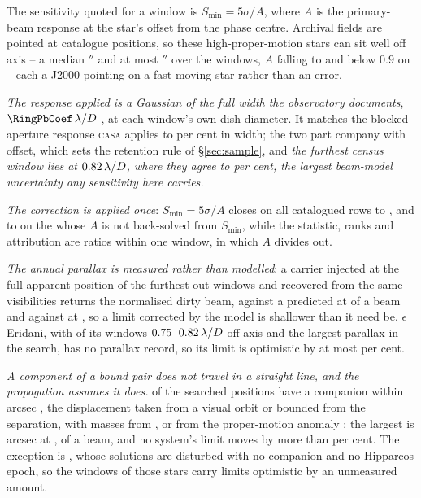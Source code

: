 The sensitivity quoted for a window is $S_{\min}=5\sigma/A$, where $A$ is the
primary-beam response at the star's offset from the phase centre. Archival
fields are pointed at catalogue positions, so these high-proper-motion stars
can sit well off axis -- a median \PbOffMed$''$ and at most \BmOffMax$''$
over the \PbNWin{} windows, $A$ falling to \BmRespMin{} and below $0.9$ on
\BmNBelowNine{} -- each a J2000 pointing on a fast-moving star rather than an
error.

\emph{The response applied is a Gaussian of the full width the observatory
documents}, $\RingPbCoef\,\lambda/D$ \citep{ALMAHandbook}, at each window's
own dish diameter. It matches the blocked-aperture response \textsc{casa}
applies \citep{CASA2022} to \BmDocAiryPct{} per cent in width; the two part
company with offset, which sets the retention rule of \S\ref{sec:sample}, and
\emph{the furthest census window lies at $0.82\,\lambda/D$, where
they agree to \BmCensusWorstPct{} per cent, the largest beam-model uncertainty
any sensitivity here carries.}



\emph{The correction is applied once}: $S_{\min}=5\sigma/A$ closes on all
\PbSminClosed{} catalogued rows to \PbSminWorstRes, and to \PbSminIndepRes{}
on the \PbSminIndep{} whose $A$ is not back-solved from $S_{\min}$, while the
statistic, ranks and attribution are ratios within one window, in which $A$
divides out.

\emph{The annual parallax is measured rather than modelled}: a carrier
injected at the full apparent position of the \SensNReextWin{} furthest-out
windows and recovered from the same visibilities returns the normalised dirty
beam, \SensPxSmallMeas{} against a predicted \SensPxSmallPred{} at
\SensPxSmallBeams{} of a beam and \SensPxLargeMeas{} against
\SensPxLargePred{} at \SensPxLargeBeams, so a limit corrected by the model is
shallower than it need be. $\epsilon$\,Eridani, with \BmEpsNOff{} of its
\BmEpsNWin{} windows $0.75$--$0.82\,\lambda/D$ off axis and the
largest parallax in the search, has no parallax record, so its limit is
optimistic by at most \BmEpsPxBoundPct{} per cent.

\emph{A component of a bound pair does not travel in a straight line, and the
propagation assumes it does.} \OmNComponent{} of the \OmNStar{} searched
positions have a companion within \OmRadius{} arcsec \citep{wds,orb6}, the
displacement taken from a visual orbit or bounded from the separation, with
masses from \citet{pecaut2013}, or from the proper-motion anomaly
\citep{kervella2022}; the largest is \OmWorstArcsec{} arcsec at \OmWorstStar,
\OmWorstBeams{} of a beam, and no system's limit moves by more than
\OmSysMovedMaxPct{} per cent. The exception is \OmFlagStars, whose solutions
are disturbed with no companion and no Hipparcos epoch, so the \OmNWinFlag{}
windows of those \OmNFlag{} stars carry limits optimistic by an unmeasured
amount.

